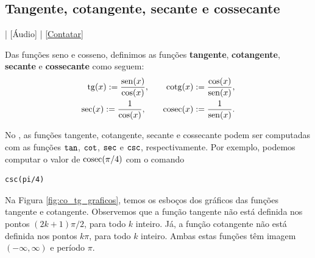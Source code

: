 \subsection{Tangente, cotangente, secante e cossecante}

\begin{flushright}
  [Vídeo] | [Áudio] | \href{https://phkonzen.github.io/notas/contato.html}{[Contatar]}
\end{flushright}

Das funções seno e cosseno, definimos as funções {\bf tangente}, {\bf cotangente}, {\bf secante} e {\bf cossecante} como seguem:
\begin{align}
  \operatorname{tg}(x) := \frac{\operatorname{sen}(x)}{\cos(x)},\qquad \operatorname{cotg}(x) := \frac{\cos(x)}{\operatorname{sen}(x)},\\
  \sec(x) := \frac{1}{\cos(x)},\qquad \operatorname{cosec}(x) := \frac{1}{\operatorname{sen}(x)}.
\end{align}

\ifispython
No \sympy, as funções tangente, cotangente, secante e cossecante podem ser computadas com as funções $\verb+tan+$, $\verb+cot+$, $\verb+sec+$ e $\verb+csc+$, respectivamente. Por exemplo, podemos computar o valor de $\operatorname{cosec}(\pi/4)$ com o comando
\begin{verbatim}
csc(pi/4)
\end{verbatim}
\fi

Na Figura \ref{fig:co_tg_graficos}, temos os esboços dos gráficos das funções tangente e cotangente. Observemos que a função tangente não está definida nos pontos $(2k+1)\pi/2$, para todo $k$ inteiro. Já, a função cotangente não está definida nos pontos $k\pi$, para todo $k$ inteiro. Ambas estas funções têm imagem $(-\infty, \infty)$ e período $\pi$.

